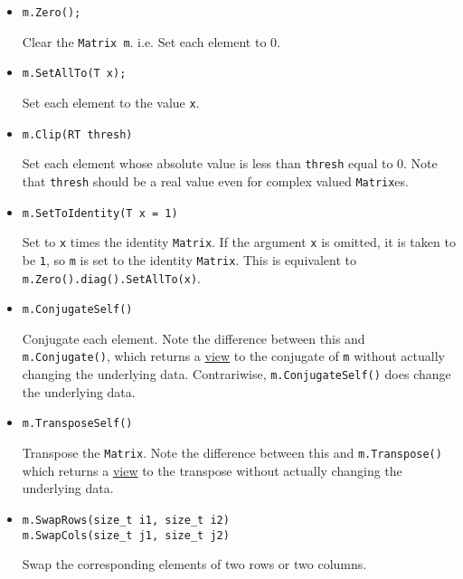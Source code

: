 \documentclass[twoside,letterpaper,11pt]{article}
\renewcommand{\tt}[1]{{\texttt {#1}}}
\begin{document}
\begin{itemize}

\item
\begin{verbatim}
m.Zero();
\end{verbatim}
Clear the \tt{Matrix~m}.  i.e. Set each element to 0.

\item
\begin{verbatim}
m.SetAllTo(T x);
\end{verbatim}
Set each element to the value \tt{x}.

\item
\begin{verbatim}
m.Clip(RT thresh)
\end{verbatim}
Set each element whose absolute value is less than \tt{thresh} equal to 0.
Note that \tt{thresh} should be a real value even for complex valued
\tt{Matrix}es.

\item
\begin{verbatim}
m.SetToIdentity(T x = 1)
\end{verbatim}
Set to \tt{x} times the identity \tt{Matrix}.  
If the argument \tt{x} is omitted, it is 
taken to be \tt{1}, so \tt{m} is set to the identity \tt{Matrix}.
This is equivalent to \tt{m.Zero().diag().SetAllTo(x)}.

\item 
\begin{verbatim}
m.ConjugateSelf()
\end{verbatim}
Conjugate each element.  Note the difference between this and \tt{m.Conjugate()}, 
which returns a \underline{view} to the conjugate of \tt{m} without
actually changing the underlying data.  Contrariwise, \tt{m.ConjugateSelf()}
does change the underlying data.

\item
\begin{verbatim}
m.TransposeSelf()
\end{verbatim}
Transpose the \tt{Matrix}.  Note the difference between this and 
\tt{m.Transpose()} which returns a \underline{view} to the transpose without 
actually changing the underlying data.

\item
\begin{verbatim}
m.SwapRows(size_t i1, size_t i2)
m.SwapCols(size_t j1, size_t j2)
\end{verbatim}
Swap the corresponding elements of two rows or two columns.


\end{itemize}
\end{document}
